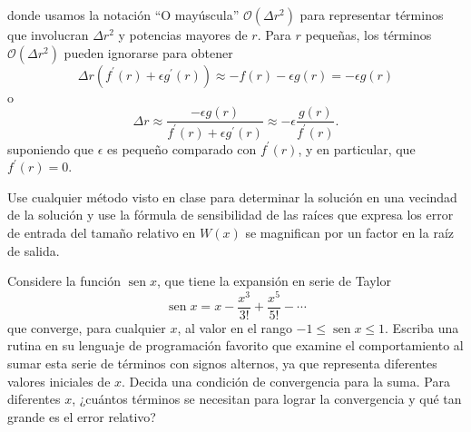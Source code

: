 \begin{questions}
    donde usamos la notación ``O mayúscula''
    $\mathcal{O}\left(\Delta r^{2}\right)$ para representar términos
    que involucran $\Delta r^{2}$ y potencias mayores de $r$.
    Para $r$ pequeñas, los términos
    $\mathcal{O}\left(\Delta r^{2}\right)$ pueden ignorarse para
    obtener
    \begin{equation*}
        \Delta r
        \left(
        f^{\prime}\left(r\right)+
        \epsilon g^{\prime}\left(r\right)
        \right)
        \approx
        -f\left(r\right)-\epsilon g\left(r\right)=
        -\epsilon g\left(r\right)
    \end{equation*}
    o
    \begin{equation*}
        \Delta r\approx
        \frac{-\epsilon g\left(r\right)}{
            f^{\prime}\left(r\right)+
            \epsilon g^{\prime}\left(r\right)
        }\approx
        -\epsilon\frac{g\left(r\right)}{f^{\prime}\left(r\right)}.
    \end{equation*}
    suponiendo que $\epsilon$ es pequeño comparado con
    $f^{\prime}\left(r\right)$, y en particular, que
    $f^{\prime}\left(r\right)=0$.

    Use cualquier método visto en clase para determinar la solución
    en una vecindad de la solución y use la fórmula
    de sensibilidad de las raíces que expresa los error de entrada
    del tamaño relativo en $W\left(x\right)$ se magnifican por un
    factor en la raíz de salida.


    \question

    Considere la función $\operatorname{sen}x$, que tiene la
    expansión en serie de Taylor
    \begin{equation*}
        \operatorname{sen}x=
        x-\frac{x^{3}}{3!}+\frac{x^{5}}{5!}-\cdots
    \end{equation*}
    que converge, para cualquier $x$, al valor en el rango
    $-1\leq\operatorname{sen}x\leq 1$.
    Escriba una rutina en su lenguaje de programación favorito que
    examine el comportamiento al sumar esta serie de términos con
    signos alternos, ya que representa diferentes valores iniciales
    de $x$.
    Decida una condición de convergencia para la suma.
    Para diferentes $x$, ¿cuántos términos se necesitan para lograr
    la convergencia y qué tan grande es el error relativo?



\end{questions}
